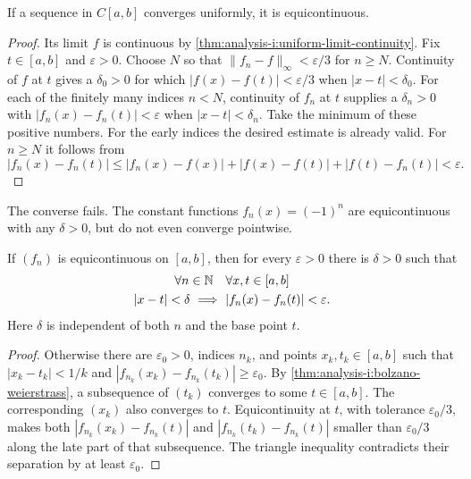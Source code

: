 \begin{proposition}
  \label{thm:analysis-i:uniform-convergence-equicontinuity}
  If a sequence in $C[a,b]$ converges uniformly, it is equicontinuous.
\end{proposition}
\begin{proof}
  Its limit $f$ is continuous by
  \autoref{thm:analysis-i:uniform-limit-continuity}. Fix $t\in[a,b]$
  and $\varepsilon>0$. Choose $N$ so that
  $\|f_n-f\|_\infty<\varepsilon/3$ for $n\ge N$. Continuity of $f$
  at $t$ gives a $\delta_0>0$ for which
  $|f(x)-f(t)|<\varepsilon/3$ when $|x-t|<\delta_0$.
  For each of the finitely many indices $n<N$, continuity of $f_n$
  at $t$ supplies a $\delta_n>0$ with
  $|f_n(x)-f_n(t)|<\varepsilon$ when $|x-t|<\delta_n$.
  Take the minimum of these positive numbers. For the early indices
  the desired estimate is already valid. For $n\ge N$ it follows from
  \[
    |f_n(x)-f_n(t)|
      \le |f_n(x)-f(x)|+|f(x)-f(t)|+|f(t)-f_n(t)|
      <\varepsilon.
  \]
\end{proof}

The converse fails. The constant functions $f_n(x)=(-1)^n$ are
equicontinuous with any $\delta>0$, but do not even converge pointwise.

\begin{proposition}
  \label{thm:analysis-i:uniform-equicontinuity}
  If $(f_n)$ is equicontinuous on $[a,b]$, then for every
  $\varepsilon>0$ there is $\delta>0$ such that
  \[
    \begin{gathered}
      \forall n\in\mathbb{N}\quad\forall x,t\in[a,b]\\
      |x-t|<\delta\ \Longrightarrow\ |f_n(x)-f_n(t)|<\varepsilon.
    \end{gathered}
  \]
  Here $\delta$ is independent of both $n$ and the base point $t$.
\end{proposition}
\begin{proof}
  Otherwise there are $\varepsilon_0>0$, indices $n_k$, and points
  $x_k,t_k\in[a,b]$ such that $|x_k-t_k|<1/k$ and
  $|f_{n_k}(x_k)-f_{n_k}(t_k)|\ge\varepsilon_0$.
  By \autoref{thm:analysis-i:bolzano-weierstrass}, a subsequence of
  $(t_k)$ converges to some $t\in[a,b]$. The corresponding $(x_k)$
  also converges to $t$. Equicontinuity at $t$, with tolerance
  $\varepsilon_0/3$, makes both
  $|f_{n_k}(x_k)-f_{n_k}(t)|$ and
  $|f_{n_k}(t_k)-f_{n_k}(t)|$ smaller than $\varepsilon_0/3$
  along the late part of that subsequence. The triangle inequality
  contradicts their separation by at least $\varepsilon_0$.
\end{proof}


